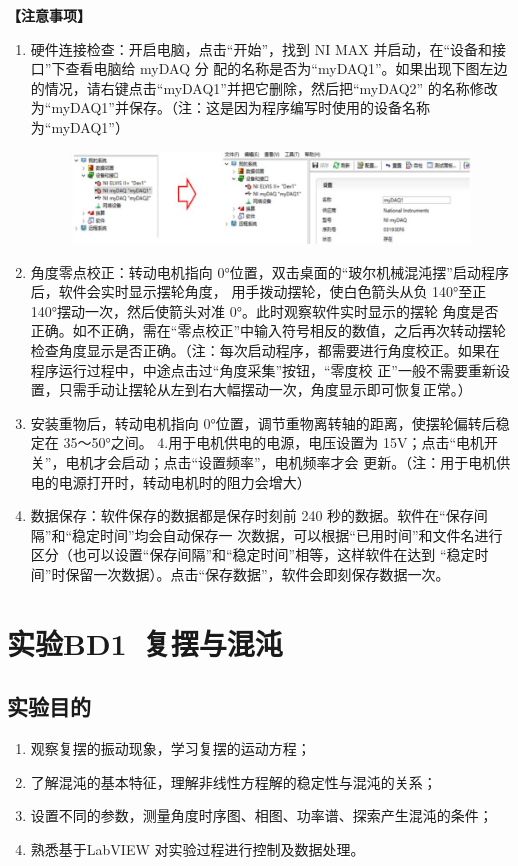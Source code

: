 \documentclass[dvipsnames, svgnames,a4paper,11pt]{article}
\begin{document}
{\textbf{【注意事项】}
\begin{enumerate}
	\item 硬件连接检查：开启电脑，点击“开始”，找到 NI MAX 并启动，在“设备和接口”下查看电脑给 myDAQ 分
    配的名称是否为“myDAQ1”。如果出现下图左边的情况，请右键点击“myDAQ1”并把它删除，然后把“myDAQ2”
    的名称修改为“myDAQ1”并保存。（注：这是因为程序编写时使用的设备名称为“myDAQ1”）   
    \begin{figure}[!h]
        \includegraphics[width=\textwidth]{3-1.png}
    \end{figure} 
    \newpage
	\item 角度零点校正：转动电机指向 0°位置，双击桌面的“玻尔机械混沌摆”启动程序后，软件会实时显示摆轮角度，
    用手拨动摆轮，使白色箭头从负 140°至正 140°摆动一次，然后使箭头对准 0°。此时观察软件实时显示的摆轮
    角度是否正确。如不正确，需在“零点校正”中输入符号相反的数值，之后再次转动摆轮检查角度显示是否正确。（{\color{red}注：每次启动程序，都需要进行角度校正。如果在程序运行过程中，中途点击过“角度采集”按钮，“零度校
    正”一般不需要重新设置，只需手动让摆轮从左到右大幅摆动一次，角度显示即可恢复正常。}）
	\item 安装重物后，转动电机指向 0°位置，调节重物离转轴的距离，使摆轮偏转后稳定在 35～50°之间。
    4.用于电机供电的电源，电压设置为 15V；点击“电机开关”，电机才会启动；点击“设置频率”，电机频率才会
    更新。（注：用于电机供电的电源打开时，转动电机时的阻力会增大）
    \item 数据保存：{\color{red}软件保存的数据都是保存时刻前 240 秒的数据。}软件在“保存间隔”和“稳定时间”均会自动保存一
    次数据，可以根据“已用时间”和文件名进行区分（也可以设置“保存间隔”和“稳定时间”相等，这样软件在达到
    “稳定时间”时保留一次数据）。点击“保存数据”，软件会即刻保存数据一次。
    
\end{enumerate}}

\clearpage
\tableofcontents
\clearpage

\setcounter{section}{0}
\section{实验BD1\ 复摆与混沌}
	
\subsection{实验目的}
\begin{enumerate}
	\item 观察复摆的振动现象，学习复摆的运动方程；
	\item 了解混沌的基本特征，理解非线性方程解的稳定性与混沌的关系；
	\item 设置不同的参数，测量角度时序图、相图、功率谱、探索产生混沌的条件；
	\item 熟悉基于LabVIEW 对实验过程进行控制及数据处理。
\end{enumerate}
\end{document}

